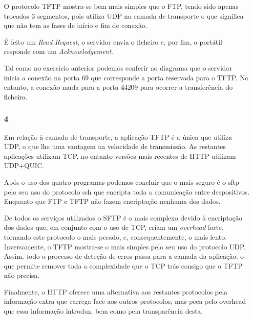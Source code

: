 \documentclass{article}
\begin{document}
                    O protocolo TFTP mostra-se bem mais simples que o FTP, tendo sido apenas trocados 3 segmentos, pois utiliza UDP na camada de transporte o que significa que não tem as fases de início e fim de conexão.

                    É feito um \textit{Read Request}, o servidor envia o ficheiro e, por fim, o portátil responde com um \textit{Acknowledgement}.

                    Tal como no exercício anterior podemos conferir no diagrama que o servidor inicia a conexão na porta 69 que corresponde a porta reservada para o TFTP. No entanto, a conexão muda para a porta 44209 para ocorrer a transferência do ficheiro.
            \subsubsection*{4}
		            Em relação à camada de transporte, a aplicação TFTP é a única que utiliza UDP, o que lhe uma vantagem na velocidade de transmissão. As restantes aplicações utilizam TCP, no entanto versões mais recentes de HTTP utilizam UDP+QUIC.

                    Após o uso dos quatro programas podemos concluir que o mais seguro é o sftp pelo seu uso do protocolo ssh que encripta toda a comunicação entre despositivos. Enquanto que FTP e TFTP não fazem encriptação nenhuma dos dados.

                    De todos os serviços utilizados o SFTP é o mais complexo devido à encriptação dos dados que, em conjunto com o uso de TCP, criam um \textit{overhead} forte, tornando este protocolo o mais pesado, e,  consequentemente, o mais lento. Inversamente, o TFTP mostra-se o mais simples 
                pelo seu uso do protocolo UDP. Assim, todo o processo de deteção de erros passa para a camada da aplicação, o que permite remover toda a complexidade que o TCP trás consigo que o TFTP não precisa.
                
                    Finalmente, o HTTP oferece uma alternativa aos restantes protocolos pela informação extra que carrega face aos outros protocolos, mas peca pelo overhead que essa informação introduz, bem como pela transparência desta.  
\end{document}
